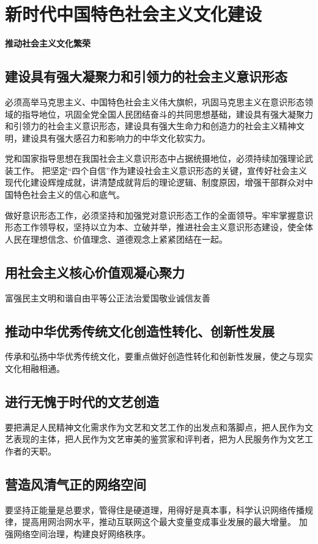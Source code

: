 \documentclass[a4paper, UTF8]{ctexart}
\begin{document}
\section{新时代中国特色社会主义文化建设}
    \textbf{推动社会主义文化繁荣}
    
    \subsection{建设具有强大凝聚力和引领力的社会主义意识形态}
    必须高举马克思主义、中国特色社会主义伟大旗帜，巩固马克思主义在意识形态领域的指导地位，巩固全党全国人民团结奋斗的共同思想基础，建设具有强大凝聚力和引领力的社会主义意识形态，建设具有强大生命力和创造力的社会主义精神文明，建设具有强大感召力和影响力的中华文化软实力。

    党和国家指导思想在我国社会主义意识形态中占据统摄地位，必须持续加强理论武装工作。
    把坚定“四个自信”作为建设社会主义意识形态的关键，宣传好社会主义现代化建设辉煌成就，讲清楚成就背后的理论逻辑、制度原因，增强干部群众对中国特色社会主义的信心和底气。

    做好意识形态工作，必须坚持和加强党对意识形态工作的全面领导。牢牢掌握意识形态工作领导权，坚持以立为本、立破并举，推进社会主义意识形态建设，使全体人民在理想信念、价值理念、道德观念上紧紧团结在一起。

    \subsection{用社会主义核心价值观凝心聚力}
    富强民主文明和谐自由平等公正法治爱国敬业诚信友善

    \subsection{推动中华优秀传统文化创造性转化、创新性发展}
    传承和弘扬中华优秀传统文化，要重点做好创造性转化和创新性发展，使之与现实文化相融相通。

    \subsection{进行无愧于时代的文艺创造}
    要把满足人民精神文化需求作为文艺和文艺工作的出发点和落脚点，把人民作为文艺表现的主体，把人民作为文艺审美的鉴赏家和评判者，把为人民服务作为文艺工作者的天职。

    \subsection{营造风清气正的网络空间}
    要坚持正能量是总要求，管得住是硬道理，用得好是真本事，科学认识网络传播规律，提高用网治网水平，推动互联网这个最大变量变成事业发展的最大增量。
    加强网络空间治理，构建良好网络秩序。
\end{document}
